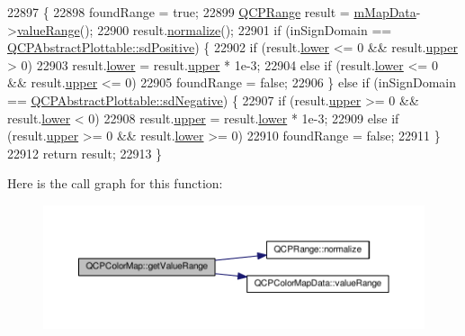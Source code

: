 \begin{DoxyCode}
22897                                                                    \{
22898   foundRange = \textcolor{keyword}{true};
22899   \hyperlink{class_q_c_p_range}{QCPRange} result = \hyperlink{class_q_c_p_color_map_a8709272aa8f0be3ca111bf3866806f8b}{mMapData}->\hyperlink{class_q_c_p_color_map_data_a025be4d7ba0494fd7b38a5a56c737f2a}{valueRange}();
22900   result.\hyperlink{class_q_c_p_range_af914a7740269b0604d0827c634a878a9}{normalize}();
22901   \textcolor{keywordflow}{if} (inSignDomain == \hyperlink{class_q_c_p_abstract_plottable_a661743478a1d3c09d28ec2711d7653d8a02951859f243a4d24e779cfbb5471030}{QCPAbstractPlottable::sdPositive}) \{
22902     \textcolor{keywordflow}{if} (result.\hyperlink{class_q_c_p_range_aa3aca3edb14f7ca0c85d912647b91745}{lower} <= 0 && result.\hyperlink{class_q_c_p_range_ae44eb3aafe1d0e2ed34b499b6d2e074f}{upper} > 0)
22903       result.\hyperlink{class_q_c_p_range_aa3aca3edb14f7ca0c85d912647b91745}{lower} = result.\hyperlink{class_q_c_p_range_ae44eb3aafe1d0e2ed34b499b6d2e074f}{upper} * 1e-3;
22904     \textcolor{keywordflow}{else} \textcolor{keywordflow}{if} (result.\hyperlink{class_q_c_p_range_aa3aca3edb14f7ca0c85d912647b91745}{lower} <= 0 && result.\hyperlink{class_q_c_p_range_ae44eb3aafe1d0e2ed34b499b6d2e074f}{upper} <= 0)
22905       foundRange = \textcolor{keyword}{false};
22906   \} \textcolor{keywordflow}{else} \textcolor{keywordflow}{if} (inSignDomain == \hyperlink{class_q_c_p_abstract_plottable_a661743478a1d3c09d28ec2711d7653d8a0fc9a70796ef60ad18ddd18056e6dc63}{QCPAbstractPlottable::sdNegative}) \{
22907     \textcolor{keywordflow}{if} (result.\hyperlink{class_q_c_p_range_ae44eb3aafe1d0e2ed34b499b6d2e074f}{upper} >= 0 && result.\hyperlink{class_q_c_p_range_aa3aca3edb14f7ca0c85d912647b91745}{lower} < 0)
22908       result.\hyperlink{class_q_c_p_range_ae44eb3aafe1d0e2ed34b499b6d2e074f}{upper} = result.\hyperlink{class_q_c_p_range_aa3aca3edb14f7ca0c85d912647b91745}{lower} * 1e-3;
22909     \textcolor{keywordflow}{else} \textcolor{keywordflow}{if} (result.\hyperlink{class_q_c_p_range_ae44eb3aafe1d0e2ed34b499b6d2e074f}{upper} >= 0 && result.\hyperlink{class_q_c_p_range_aa3aca3edb14f7ca0c85d912647b91745}{lower} >= 0)
22910       foundRange = \textcolor{keyword}{false};
22911   \}
22912   \textcolor{keywordflow}{return} result;
22913 \}
\end{DoxyCode}


Here is the call graph for this function\+:\nopagebreak
\begin{figure}[H]
\begin{center}
\leavevmode
\includegraphics[width=350pt]{class_q_c_p_color_map_ac1b906e05ca9b61680e61b74b3825a22_cgraph}
\end{center}
\end{figure}



